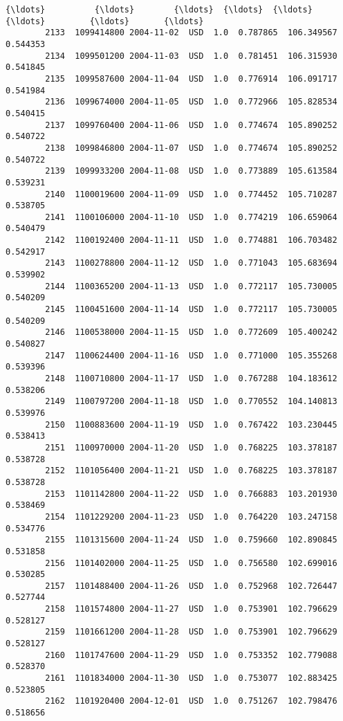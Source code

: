 \documentclass[11pt]{article}
\begin{document}
\begin{Verbatim}[commandchars=\\\{\}]
        {\ldots}          {\ldots}        {\ldots}  {\ldots}  {\ldots}       {\ldots}         {\ldots}       {\ldots}   
        2133  1099414800 2004-11-02  USD  1.0  0.787865  106.349567  0.544353   
        2134  1099501200 2004-11-03  USD  1.0  0.781451  106.315930  0.541845   
        2135  1099587600 2004-11-04  USD  1.0  0.776914  106.091717  0.541984   
        2136  1099674000 2004-11-05  USD  1.0  0.772966  105.828534  0.540415   
        2137  1099760400 2004-11-06  USD  1.0  0.774674  105.890252  0.540722   
        2138  1099846800 2004-11-07  USD  1.0  0.774674  105.890252  0.540722   
        2139  1099933200 2004-11-08  USD  1.0  0.773889  105.613584  0.539231   
        2140  1100019600 2004-11-09  USD  1.0  0.774452  105.710287  0.538705   
        2141  1100106000 2004-11-10  USD  1.0  0.774219  106.659064  0.540479   
        2142  1100192400 2004-11-11  USD  1.0  0.774881  106.703482  0.542917   
        2143  1100278800 2004-11-12  USD  1.0  0.771043  105.683694  0.539902   
        2144  1100365200 2004-11-13  USD  1.0  0.772117  105.730005  0.540209   
        2145  1100451600 2004-11-14  USD  1.0  0.772117  105.730005  0.540209   
        2146  1100538000 2004-11-15  USD  1.0  0.772609  105.400242  0.540827   
        2147  1100624400 2004-11-16  USD  1.0  0.771000  105.355268  0.539396   
        2148  1100710800 2004-11-17  USD  1.0  0.767288  104.183612  0.538206   
        2149  1100797200 2004-11-18  USD  1.0  0.770552  104.140813  0.539976   
        2150  1100883600 2004-11-19  USD  1.0  0.767422  103.230445  0.538413   
        2151  1100970000 2004-11-20  USD  1.0  0.768225  103.378187  0.538728   
        2152  1101056400 2004-11-21  USD  1.0  0.768225  103.378187  0.538728   
        2153  1101142800 2004-11-22  USD  1.0  0.766883  103.201930  0.538469   
        2154  1101229200 2004-11-23  USD  1.0  0.764220  103.247158  0.534776   
        2155  1101315600 2004-11-24  USD  1.0  0.759660  102.890845  0.531858   
        2156  1101402000 2004-11-25  USD  1.0  0.756580  102.699016  0.530285   
        2157  1101488400 2004-11-26  USD  1.0  0.752968  102.726447  0.527744   
        2158  1101574800 2004-11-27  USD  1.0  0.753901  102.796629  0.528127   
        2159  1101661200 2004-11-28  USD  1.0  0.753901  102.796629  0.528127   
        2160  1101747600 2004-11-29  USD  1.0  0.753352  102.779088  0.528370   
        2161  1101834000 2004-11-30  USD  1.0  0.753077  102.883425  0.523805   
        2162  1101920400 2004-12-01  USD  1.0  0.751267  102.798476  0.518656   
        

\end{Verbatim}
\end{document}
